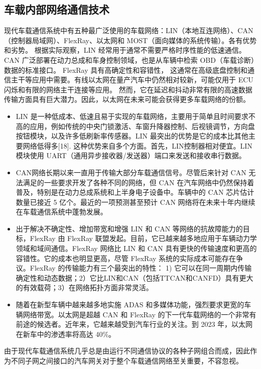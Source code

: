 \subsection{车载内部网络通信技术}
现代车载通信系统中有五种最广泛使用的车载网络：LIN（本地互连网络）、CAN（控制器局域网）、FlexRay、以太网和 MOST（面向媒体的系统传输）。各有优势和劣势。
根据实际观察，LIN 经常用于通常不需要严格时序性能的低速通信。CAN 广泛部署在动力总成和车身控制领域，也是从车辆中检索 OBD（车载诊断）数据的标准接口。
FlexRay 具有高确定性和容错性，
这通常在高级底盘控制和通信主干等应用中需要。有线以太网在量产汽车中仍然相对较新，可能仅用于 ECU 闪烁和有限的网络主干连接等应用。
然而，它在延迟和抖动非常有限的高速数据传输方面具有巨大潜力。因此，以太网在未来可能会获得更多车载网络的份额。

\begin{itemize}
    \item LIN 是一种低成本、低速且易于实现的车载网络，主要用于简单且时间要求不高的应用，例如传统的中央门锁激活、车窗升降器控制、后视镜调节，方向盘按钮模块，以及许多低刷新率传感器。LIN 最突出的优势是它的成本比其他主要网络低得多[18]. 这种优势来自多个方面。首先，LIN控制器相对便宜。LIN 模块使用 UART（通用异步接收器/发送器）端口来发送和接收串行数据。
    \item CAN网络长期以来一直用于传输大部分车载通信信号。尽管后来针对 CAN 无法满足的一些要求开发了各种不同的网络，但 CAN 在汽车网络中仍然保持着普及，特别是在动力总成系统和上半身电子设备中。车辆中的 CAN 芯片估计数量已接近 5 亿个。最近的一项预测甚至预计 CAN 网络将在未来十年内继续在车载通信系统中蓬勃发展。
    \item 出于解决不确定性、增加带宽和增强 LIN 和 CAN 等网络的抗故障能力的目标，FlexRay 由 FlexRay 联盟发起。目前，它已越来越多地应用于车辆动力学领域和域间通信。FlexRay 网络比 LIN 和 CAN 具有更快的传输速度和更高的容错性。它的成本也明显更高，尽管 FlexRay 系统的实际成本可能存在争议。FlexRay 的传输能力有三个最突出的特性： 1) 它可以在同一周期内传输确定性和动态数据；2）它比LIN和CAN（包括TTCAN和CANFD）具有更大的有效载荷；3）在网络拓扑方面非常灵活。
    \item 随着在新型车辆中越来越多地实施 ADAS 和多媒体功能，强烈要求更宽的车辆网络带宽。以太网是超越 CAN 和 FlexRay 的下一代车载网络的一个非常有前途的候选者。近年来，它越来越受到汽车行业的关注。到 2023 年，以太网在新车中的渗透率将高达 40\%。
\end{itemize}

由于现代车载通信系统几乎总是由运行不同通信协议的各种子网组合而成，因此作为不同子网之间接口的汽车网关对于整个车载通信网络至关重要，不容忽视。

